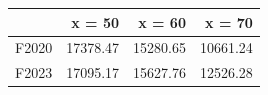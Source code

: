 \begin{tabular}{lrrr}
\toprule
 & x = 50 & x = 60 & x = 70 \\
\midrule
F2020 & 17378.47 & 15280.65 & 10661.24 \\
F2023 & 17095.17 & 15627.76 & 12526.28 \\
\bottomrule
\end{tabular}
